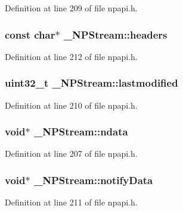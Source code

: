 Definition at line 209 of file npapi.h.

\hypertarget{struct___n_p_stream_a5a7c75fa7838035e29cfe03822e5a38c}{
\subsubsection[{headers}]{\setlength{\rightskip}{0pt plus 5cm}const char$\ast$ {\bf \_\-NPStream::headers}}}
\label{struct___n_p_stream_a5a7c75fa7838035e29cfe03822e5a38c}


Definition at line 212 of file npapi.h.

\hypertarget{struct___n_p_stream_aebb004f9e61be47fa87ffd114e18ba39}{
\subsubsection[{lastmodified}]{\setlength{\rightskip}{0pt plus 5cm}uint32\_\-t {\bf \_\-NPStream::lastmodified}}}
\label{struct___n_p_stream_aebb004f9e61be47fa87ffd114e18ba39}


Definition at line 210 of file npapi.h.

\hypertarget{struct___n_p_stream_a54536dc05130cae4e6fea0d000eec74e}{
\subsubsection[{ndata}]{\setlength{\rightskip}{0pt plus 5cm}void$\ast$ {\bf \_\-NPStream::ndata}}}
\label{struct___n_p_stream_a54536dc05130cae4e6fea0d000eec74e}


Definition at line 207 of file npapi.h.

\hypertarget{struct___n_p_stream_af1d340c461ec06c3b763a644b63e7d0f}{
\subsubsection[{notifyData}]{\setlength{\rightskip}{0pt plus 5cm}void$\ast$ {\bf \_\-NPStream::notifyData}}}
\label{struct___n_p_stream_af1d340c461ec06c3b763a644b63e7d0f}


Definition at line 211 of file npapi.h.


